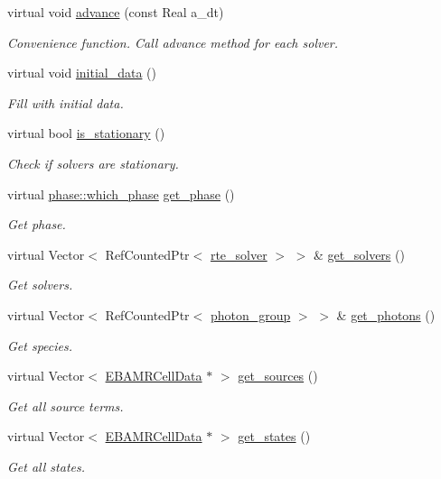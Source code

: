 \begin{DoxyCompactItemize}
virtual void \hyperlink{classrte__layout_a22b96ebf899cd8501b9d693ad73c26a6}{advance} (const Real a\+\_\+dt)
\begin{DoxyCompactList}\small\item\em Convenience function. Call advance method for each solver. \end{DoxyCompactList}\item 
virtual void \hyperlink{classrte__layout_a796000e7b713273b9a315f0b21948d34}{initial\+\_\+data} ()
\begin{DoxyCompactList}\small\item\em Fill with initial data. \end{DoxyCompactList}\item 
virtual bool \hyperlink{classrte__layout_a5f22561c6b8ffa7e2bd3d26f1053782c}{is\+\_\+stationary} ()
\begin{DoxyCompactList}\small\item\em Check if solvers are stationary. \end{DoxyCompactList}\item 
virtual \hyperlink{namespacephase_a23c76f548a5eb1955ed8c929c541108b}{phase\+::which\+\_\+phase} \hyperlink{classrte__layout_a20e47ac06991f34a349f20438559e81d}{get\+\_\+phase} ()
\begin{DoxyCompactList}\small\item\em Get phase. \end{DoxyCompactList}\item 
virtual Vector$<$ Ref\+Counted\+Ptr$<$ \hyperlink{classrte__solver}{rte\+\_\+solver} $>$ $>$ \& \hyperlink{classrte__layout_a17f78417be863784474f39621df9dc09}{get\+\_\+solvers} ()
\begin{DoxyCompactList}\small\item\em Get solvers. \end{DoxyCompactList}\item 
virtual Vector$<$ Ref\+Counted\+Ptr$<$ \hyperlink{classphoton__group}{photon\+\_\+group} $>$ $>$ \& \hyperlink{classrte__layout_affda750f0bdfd865aa216177f525d889}{get\+\_\+photons} ()
\begin{DoxyCompactList}\small\item\em Get species. \end{DoxyCompactList}\item 
virtual Vector$<$ \hyperlink{type__definitions_8H_a7e610f301989e5e07781c5e338bdb7c3}{E\+B\+A\+M\+R\+Cell\+Data} $\ast$ $>$ \hyperlink{classrte__layout_ab07a2f0cce683fdf4533ee39628d7ef1}{get\+\_\+sources} ()
\begin{DoxyCompactList}\small\item\em Get all source terms. \end{DoxyCompactList}\item 
virtual Vector$<$ \hyperlink{type__definitions_8H_a7e610f301989e5e07781c5e338bdb7c3}{E\+B\+A\+M\+R\+Cell\+Data} $\ast$ $>$ \hyperlink{classrte__layout_ad78fa13293450f72fc5b1e1130393ddf}{get\+\_\+states} ()
\begin{DoxyCompactList}\small\item\em Get all states. \end{DoxyCompactList}\end{DoxyCompactItemize}
